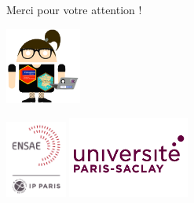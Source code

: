 \documentclass[10pt,xcolor=table,color={dvipsnames,usenames},ignorenonframetext,usepdftitle=false,french]{beamer}
\begin{document}
\begin{frame}{Merci pour votre attention !}
\protect\hypertarget{merci-pour-votre-attention}{}
\begin{center}
\includegraphics[width = 2.5cm]{../rapport/logos/avatar_antuki_v2_small.png}
\end{center}

\bigskip

\begin{center}
\includegraphics[width = 2cm]{../rapport/logos/logo.png}
\includegraphics[width = 4cm]{../rapport/logos/saclay_violet.png}
\end{center}
\end{frame}
\end{document}
